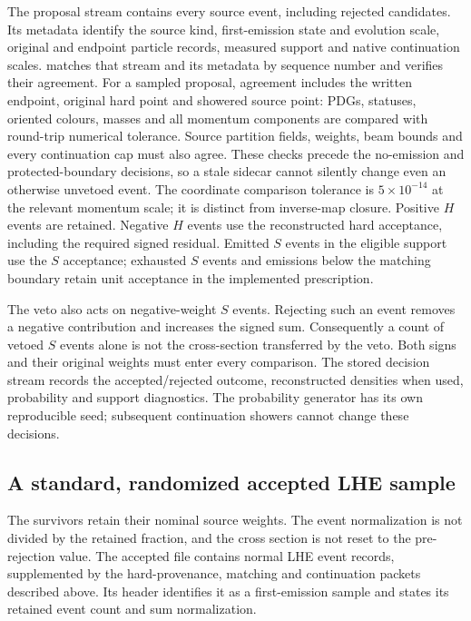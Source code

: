 The proposal stream contains every source event, including rejected
candidates.  Its metadata identify the source kind, first-emission
state and evolution scale, original and endpoint particle records,
measured support and native continuation scales.
 matches that stream and its metadata
by sequence number and verifies their agreement. For a sampled proposal,
agreement includes the
written endpoint, original hard point and showered source point: PDGs,
statuses, oriented colours, masses and all momentum components are
compared with round-trip numerical tolerance. Source partition fields,
weights, beam bounds and every continuation cap must also agree.
These checks precede the no-emission and protected-boundary decisions,
so a stale sidecar cannot silently change even an otherwise unvetoed
event. The coordinate comparison tolerance is $5\times10^{-14}$ at
the relevant momentum scale; it is distinct from inverse-map closure.
Positive \(H\)
events are retained.  Negative \(H\) events use the reconstructed hard
acceptance, including the required signed residual.  Emitted \(S\)
events in the eligible support use the \(S\) acceptance; exhausted
\(S\) events and emissions below the matching boundary retain unit
acceptance in the implemented prescription.

The veto also acts on negative-weight \(S\) events.  Rejecting such an
event removes a negative contribution and increases the signed sum.
Consequently a count of vetoed \(S\) events alone is not the
cross-section transferred by the veto.  Both signs and their original
weights must enter every comparison.  The stored decision stream
records the accepted/rejected outcome, reconstructed densities when
used, probability and support diagnostics.  The probability generator
has its own reproducible seed; subsequent continuation showers cannot
change these decisions.

\subsection{A standard, randomized accepted LHE sample}
\label{sec:impl-collection}

The survivors retain their nominal source weights.  The event
normalization is not divided by the retained fraction, and the
cross section is not reset to the pre-rejection value.  The accepted
file contains normal LHE event records, supplemented by the
hard-provenance, matching and continuation packets described above.
Its header identifies it as a first-emission sample and states its
retained event count and sum normalization.

